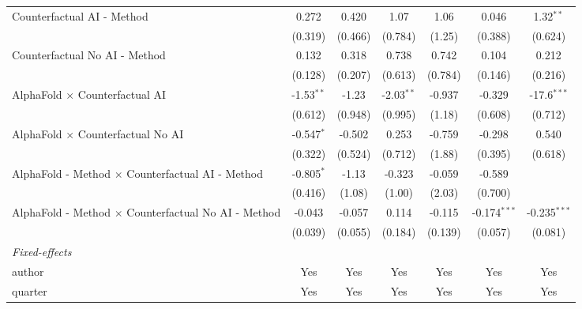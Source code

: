 \begin{tabular}{lcccccc}
   Counterfactual AI - Method                                 & 0.272         & 0.420         & 1.07         & 1.06    & 0.046          & 1.32$^{**}$\\   
                                                              & (0.319)       & (0.466)       & (0.784)      & (1.25)  & (0.388)        & (0.624)\\   
   Counterfactual No AI - Method                              & 0.132         & 0.318         & 0.738        & 0.742   & 0.104          & 0.212\\   
                                                              & (0.128)       & (0.207)       & (0.613)      & (0.784) & (0.146)        & (0.216)\\   
   AlphaFold $\times$ Counterfactual AI                       & -1.53$^{**}$  & -1.23         & -2.03$^{**}$ & -0.937  & -0.329         & -17.6$^{***}$\\   
                                                              & (0.612)       & (0.948)       & (0.995)      & (1.18)  & (0.608)        & (0.712)\\   
   AlphaFold $\times$ Counterfactual No AI                    & -0.547$^{*}$  & -0.502        & 0.253        & -0.759  & -0.298         & 0.540\\   
                                                              & (0.322)       & (0.524)       & (0.712)      & (1.88)  & (0.395)        & (0.618)\\   
   AlphaFold - Method $\times$ Counterfactual AI - Method     & -0.805$^{*}$  & -1.13         & -0.323       & -0.059  & -0.589         &   \\   
                                                              & (0.416)       & (1.08)        & (1.00)       & (2.03)  & (0.700)        &   \\   
   AlphaFold - Method $\times$ Counterfactual No AI - Method  & -0.043        & -0.057        & 0.114        & -0.115  & -0.174$^{***}$ & -0.235$^{***}$\\   
                                                              & (0.039)       & (0.055)       & (0.184)      & (0.139) & (0.057)        & (0.081)\\   
   \midrule
   \emph{Fixed-effects}\\
   author                                                     & Yes           & Yes           & Yes          & Yes     & Yes            & Yes\\  
   quarter                                                    & Yes           & Yes           & Yes          & Yes     & Yes            & Yes\\  

\end{tabular}
